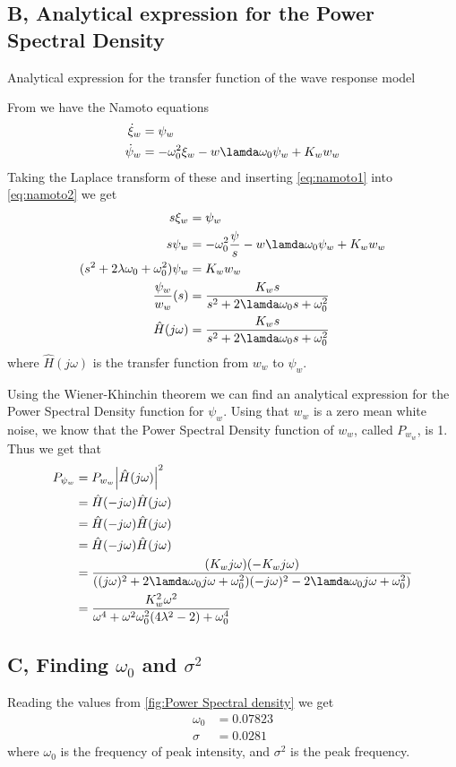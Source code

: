 \subsection{B, Analytical expression for the Power Spectral Density}
Analytical expression for the transfer function of the wave response model

From \cite{assignment} we have the Namoto equations
\begin{align}
    \dot{\xi}_w &= \psi_w\label{eq:namoto1}\\
    \dot{\psi}_w &= -\omega_0^2\xi_w-w\lamda\omega_0\psi_w+K_{w}w_w\label{eq:namoto2}
\end{align}
Taking the Laplace transform of these and inserting \ref{eq:namoto1} into \ref{eq:namoto2} we get
\begin{align*}
    s\xi_w &= \psi_w\\
    s\psi_w &= -\omega_0^2\frac{\psi}{s} - w\lamda\omega_0\psi_w + K_{w}w_w\\
    (s^2+2\lambda\omega_0+\omega_0^2)\psi_w &= K_{w}w_w\\
    \frac{\psi_w}{w_w}(s) &= \frac{K_{w}s}{s^2+2\lamda\omega_0s+\omega_0^2}\\
    \hat{H}(j\omega) &= \frac{K_{w}s}{s^2+2\lamda\omega_0s+\omega_0^2}
\end{align*}
where $\hat{H}(j\omega)$ is the transfer function from $w_w$ to $\psi_w$.

Using the Wiener-Khinchin theorem \cite{Wiener-Kinchkin} we can find an analytical expression for the Power Spectral Density function for $\psi_w$. 
Using that $w_w$ is a zero mean white noise, we know that the Power Spectral Density function of $w_w$, called $P_{w_{w}}$, is 1. Thus we get that 
\begin{align*}
    P_{\psi_{w}} &= P_{w_w}\abs{\hat{H}(j\omega)}^2\\
    &= \hat{H}(-j\omega)\hat{H}(j\omega)\\
    &= \hat{H}(-j\omega)\hat{H}(j\omega)\\
    &= \hat{H}(-j\omega)\hat{H}(j\omega)\\
    &= \frac{(K_{w}j\omega)(-K_{w}j\omega)}{((j\omega)^2+2\lamda\omega_0j\omega+\omega_0^2)(-j\omega)^2-2\lamda\omega_0j\omega+\omega_0^2)}\\
    &= \frac{K_{w}^2\omega^2}{\omega^4+\omega^2\omega_0^2(4\lambda^2-2)+\omega_0^4}
\end{align*}


\subsection{C, Finding $\omega_0$ and $\sigma^2$}
Reading the values from \cref{fig:Power Spectral density} we get
\begin{align*}
    \omega_0 &= 0.07823\\
    \sigma &= 0.0281
\end{align*}
where $\omega_0$ is the frequency of peak intensity, and $\sigma^2$ is the peak frequency. 


